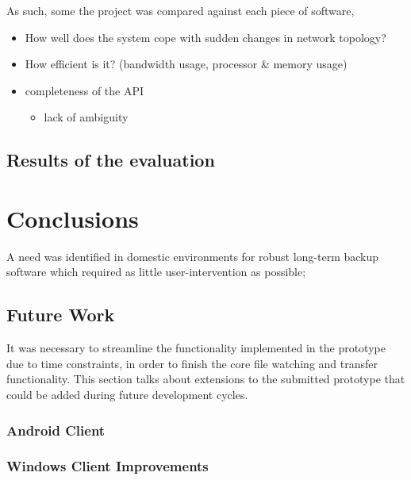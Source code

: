 \documentclass[12pt,a4paper,]{adreport}
\begin{document}
As such, some the project was compared against each piece of software,

\begin{itemize}
\itemsep1pt\parskip0pt
\item
  How well does the system cope with sudden changes in network topology?
\item
  How efficient is it? (bandwidth usage, processor \& memory usage)
\item
  completeness of the API

  \begin{itemize}
  \itemsep1pt\parskip0pt
  \item
    lack of ambiguity
  \end{itemize}
\end{itemize}

\section{Results of the evaluation}\label{results-of-the-evaluation}

\chapter{Conclusions}\label{conclusions}

A need was identified in domestic environments for robust long-term
backup software which required as little user-intervention as possible;

\section{Future Work}\label{future-work}

It was necessary to streamline the functionality implemented in the
prototype due to time constraints, in order to finish the core file
watching and transfer functionality. This section talks about extensions
to the submitted prototype that could be added during future development
cycles.

\subsection{Android Client}\label{android-client}

\subsection{Windows Client
Improvements}\label{windows-client-improvements}
\end{document}
